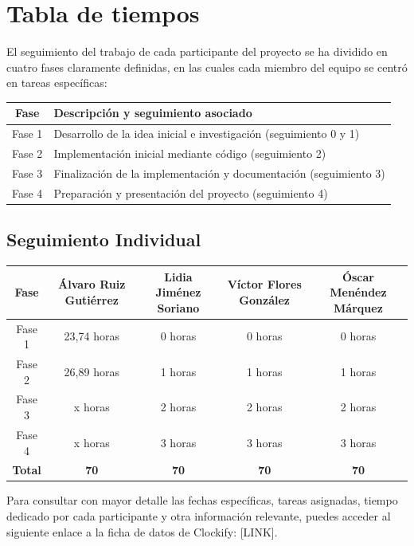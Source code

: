 \documentclass[a4paper]{article}
\begin{document}
  \newpage

\section{Tabla de tiempos}

El seguimiento del trabajo de cada participante del proyecto se ha dividido en cuatro fases claramente definidas, en las cuales cada miembro del equipo se centró en tareas específicas:
\begin{center}
  \begin{tabular}{|c|l|}
  \hline
  \textbf{Fase} & \textbf{Descripción y seguimiento asociado} \\
  \hline
  Fase 1 & Desarrollo de la idea inicial e investigación (seguimiento 0 y 1) \\
  Fase 2 & Implementación inicial mediante código (seguimiento 2) \\
  Fase 3 & Finalización de la implementación y documentación (seguimiento 3) \\
  Fase 4 & Preparación y presentación del proyecto (seguimiento 4) \\
  \hline
  \end{tabular}
  \end{center}

  \subsection*{Seguimiento Individual}

  \begin{center}
  \begin{tabular}{|c|c|c|c|c|}
  \hline
  Fase & Álvaro Ruiz Gutiérrez & Lidia Jiménez Soriano & Víctor Flores González & Óscar Menéndez Márquez \\
  \hline
  Fase 1 & 23,74 horas & 0 horas& 0 horas& 0 horas\\
  Fase 2 & 26,89 horas & 1 horas& 1 horas& 1 horas\\
  Fase 3 & x horas& 2 horas & 2 horas& 2 horas\\
  Fase 4 & x horas& 3 horas & 3 horas& 3 horas\\
  \hline
  \textbf{Total} & \textbf{70} & \textbf{70} & \textbf{70} & \textbf{70} \\
  \hline
  \end{tabular}
  \end{center}
  

Para consultar con mayor detalle las fechas específicas, tareas asignadas, tiempo dedicado por cada participante y otra información relevante, puedes acceder al siguiente enlace a la ficha de datos de Clockify: [LINK].
\newpage
\end{document}

